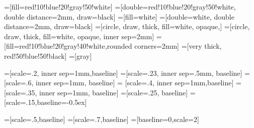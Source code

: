 \documentclass[ aspectratio=169,  10pt,blue,xcolor=pdftex,dvipsnames,table,handout,notes]{beamer}
\begin{document}
=[fill=red!10!blue!20!gray!50!white]
=[double=red!10!blue!20!gray!50!white, double distance=2mm, draw=black]
=[fill=white]
=[double=white, double distance=2mm, draw=black]
=[circle, draw, thick, fill=white, opaque,]
=[circle, draw, thick, fill=white, opaque, inner sep=2mm]
= [fill=red!10!blue!20!gray!40!white,rounded corners=2mm] 
=[very thick, red!50!blue!50!black]
=[gray]

=[scale=.2, inner sep=1mm,baseline]
=[scale=.23, inner sep=.5mm, baseline]
=[scale=.6, inner sep=1mm, baseline]
= [scale=.4, inner sep=1mm,baseline] 
=[scale=.35, inner sep=1mm, baseline]
=[scale=.25, baseline]
=[scale=.15,baseline=-0.5ex]

=[scale=.5,baseline]
=[scale=.7,baseline]
=[baseline=0,scale=2]
\end{document}
